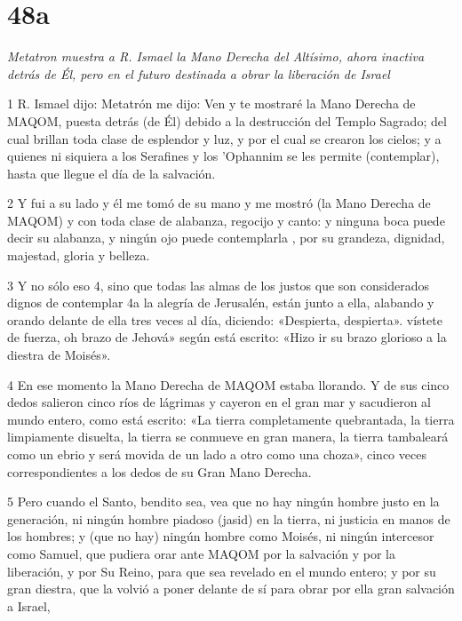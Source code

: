 \chapter{48a}

\par \textit{Metatron muestra a R. Ismael la Mano Derecha del Altísimo, ahora inactiva detrás de Él, pero en el futuro destinada a obrar la liberación de Israel}

\par 1 R. Ismael dijo: Metatrón me dijo: Ven y te mostraré la Mano Derecha de MAQOM, puesta detrás (de Él) debido a la destrucción del Templo Sagrado; del cual brillan toda clase de esplendor y luz, y por el cual se crearon los cielos; y a quienes ni siquiera a los Serafines y los 'Ophannim se les permite (contemplar), hasta que llegue el día de la salvación.

\par 2 Y fui a su lado y él me tomó de su mano y me mostró (la Mano Derecha de MAQOM) y con toda clase de alabanza, regocijo y canto: y ninguna boca puede decir su alabanza, y ningún ojo puede contemplarla , por su grandeza, dignidad, majestad, gloria y belleza.

\par 3 Y no sólo eso 4, sino que todas las almas de los justos que son considerados dignos de contemplar 4a la alegría de Jerusalén, están junto a ella, alabando y orando delante de ella tres veces al día, diciendo: «Despierta, despierta». vístete de fuerza, oh brazo de Jehová» según está escrito: «Hizo ir su brazo glorioso a la diestra de Moisés».

\par 4 En ese momento la Mano Derecha de MAQOM estaba llorando. Y de sus cinco dedos salieron cinco ríos de lágrimas y cayeron en el gran mar y sacudieron al mundo entero, como está escrito: «La tierra completamente quebrantada, la tierra limpiamente disuelta, la tierra se conmueve en gran manera, la tierra tambaleará como un ebrio y será movida de un lado a otro como una choza», cinco veces correspondientes a los dedos de su Gran Mano Derecha.

\par 5 Pero cuando el Santo, bendito sea, vea que no hay ningún hombre justo en la generación, ni ningún hombre piadoso (jasid) en la tierra, ni justicia en manos de los hombres; y (que no hay) ningún hombre como Moisés, ni ningún intercesor como Samuel, que pudiera orar ante MAQOM por la salvación y por la liberación, y por Su Reino, para que sea revelado en el mundo entero; y por su gran diestra, que la volvió a poner delante de sí para obrar por ella gran salvación a Israel,


